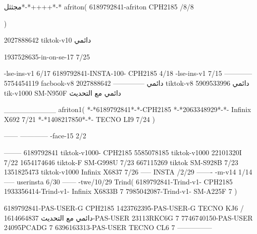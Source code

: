 مجثثل*-*++++*-*
afriton(
6189792841-afriton CPH2185  /8/8

)

2027888642 tiktok-v10
دائمي

1937528635-in-on-se-17 7/25

-lse-ins-v1 6/17
6189792841-INSTA-100- CPH2185 4/18
-lse-ins-v1 7/15
------------
5754454119 facbook-v8
دائمي
--------------
2027888642 tiktok-v8
دائمي
5909533996 tik-v1000  SM-N950F
دائمي مع التحديث

__________
afriton1(
*-*6189792841*-*-CPH2185
*-*2063348929*-*-  Infinix X692  7/21
*-*1408217850*-*-   TECNO LI9  7/24
)


------
------------
-face-15 2/2

--------
6189792841 tiktok-v1000- CPH2185 
5585078185 tiktok-v1000 22101320I  7/22
1654174646 tiktok-F SM-G998U  7/23
667115269 tiktok SM-S928B  7/23
1351825473 tiktok-v1000 Infinix X6837  7/26
-----
 INSTA /2/29
-------
-m-v14 1/14
-----
userinsta 6/30
------
-twe/10/29
Trind(
6189792841-Trind-v1- CPH2185 
1933356414-Trind-v1- Infinix X6833B 7
7985042087-Trind-v1- SM-A225F 7
)


6189792841-PAS-USER-G CPH2185 
1423762395-PAS-USER-G TECNO KJ6  /دائمي مع التحديث
1614664837-PAS-USER 23113RKC6G 7
7746740150-PAS-USER 24095PCADG 7
6396163313-PAS-USER TECNO CL6 7
    ---------------
